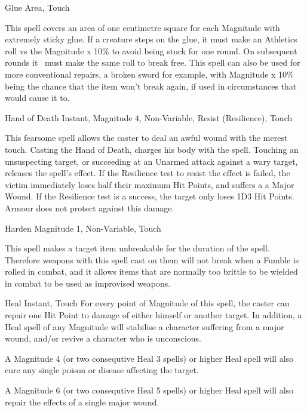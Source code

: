 \begin{rpg-spell}
{Glue}
{Area, Touch}

This spell covers an area of one centimetre square for each Magnitude with extremely sticky glue. If a creature steps on the glue, it must make an Athletics roll vs the Magnitude x 10\% to avoid being stuck for one round. On subsequent rounds it  must make the same roll to break free. This spell can also be used for more conventional repairs, a broken sword for example, with Magnitude x 10\% being the chance that the item won’t break again, if used in circumstances that would cause it to.
\end{rpg-spell}


\begin{rpg-spell}
{Hand of Death}
{Instant, Magnitude 4, Non-Variable, Resist (Resilience), Touch}

This fearsome spell allows the caster to deal an awful wound with the merest touch. Casting the Hand of Death, charges his body with the spell. Touching an unsuspecting target, or succeeding at an Unarmed attack against a wary target, releases the spell’s effect. If the Resilience test to resist the effect is failed, the victim immediately loses half their maximum Hit Points, and suffers a a Major Wound. If the Resilience test is a success, the target only loses 1D3 Hit Points. Armour does not protect against this damage.
\end{rpg-spell}


\begin{rpg-spell}
{Harden}
{Magnitude 1, Non-Variable, Touch}

This spell makes a target item unbreakable for the duration of the spell.  Therefore weapons with this spell cast on them will not break when a Fumble is rolled in combat, and it allows items that are normally too brittle to be wielded in combat to be used as improvised weapons.
\end{rpg-spell}


\begin{rpg-spell}
{Heal}
{Instant, Touch}
For every point of Magnitude of this spell, the caster can repair one Hit Point to damage of either himself or another target. In addition, a Heal spell of any Magnitude will stabilise a character suffering from a major wound, and/or revive a character who is unconscious. 

A Magnitude 4 (or two consequtive Heal 3 spells) or higher Heal spell will also cure any single poison or disease affecting the target. 

A Magnitude 6 (or two consequtive Heal 5 spells) or higher Heal spell will also repair the effects of a single major wound.
\end{rpg-spell}


